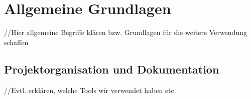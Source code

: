 
\chapter{Allgemeine Grundlagen}
\label{chap:Allgemeine Grundlagen} 
//Hier allgemeine Begriffe klären bzw. Grundlagen für die weitere Verwendung schaffen



\section{Projektorganisation und Dokumentation}
//Evtl. erklären, welche Tools wir verwendet haben etc.